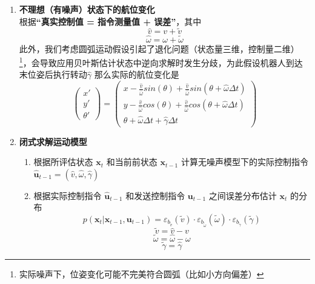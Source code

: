 \documentclass[../main.tex]{subfiles}
\begin{document}
\begin{enumerate}
\begin{enumerate}
        \item \textbf{不理想（有噪声）状态下的航位变化}\\
        根据\textbf{“真实控制值 = 指令测量值 + 误差”}，其中
        $$\widehat{v}=v+\widetilde{v}$$
        $$\widehat{\omega}=\omega+\widetilde{\omega}$$
        此外，我们考虑圆弧运动假设引起了退化问题（状态量三维，控制量二维）\footnote{实际噪声下，位姿变化可能不完美符合圆弧（比如小方向偏差）}，会导致应用贝叶斯估计状态中逆向求解时发生分歧，为此假设机器人到达末位姿后执行转动$\widehat{\gamma}$
        \vspace{1em}
        那么实际的航位变化是
        $$\begin{pmatrix}x'\\y'\\\theta'\end{pmatrix}=\begin{pmatrix}x-\frac{\widehat{v}}{\widehat{\omega}}sin(\theta)+\frac{\widehat{v}}{\widehat{\omega}}sin(\theta+\widehat{\omega}\Delta t)\\y-\frac{\widehat{v}}{\widehat{\omega}}cos(\theta)+\frac{\widehat{v}}{\widehat{\omega}}cos(\theta+\widehat{\omega}\Delta t)\\\theta+\widehat{\omega}\Delta t+\widehat{\gamma}\Delta t\end{pmatrix}$$
        
        \item \textbf{闭式求解运动模型}
        \begin{enumerate}
            \item 根据所评估状态 $\mathbf{x}_t$ 和当前前状态 $\mathbf{x}_{t-1}$ 计算无噪声模型下的实际控制指令$\widehat{\mathbf{u}}_{t-1} = (\widehat{v}, \widehat{\omega}, \widehat{\gamma})$ 
            \item 根据实际控制指令 $\widehat{\mathbf{u}}_{t-1}$ 和发送控制指令 $\mathbf{u}_{t-1}$ 之间误差分布估计 $\mathbf{x}_t$ 的分布
            $$p(\mathbf{x}_t | \mathbf{x}_{t-1}, \mathbf{u}_{t-1}) = \varepsilon_{b_{\widetilde{v}}}(\widetilde{v}) \cdot \varepsilon_{b_{\widetilde{\omega}}}(\widetilde{\omega}) \cdot \varepsilon_{b_{\widetilde{\gamma}}}(\widetilde{\gamma})$$
            $$\widetilde{v} = \widehat{v} - v$$
            $$ \widetilde{\omega} = \widehat{\omega} - \omega$$
            $$ \widetilde{\gamma} = \widehat{\gamma}$$
        \end{enumerate}


\end{enumerate}
\end{enumerate}
\end{document}
